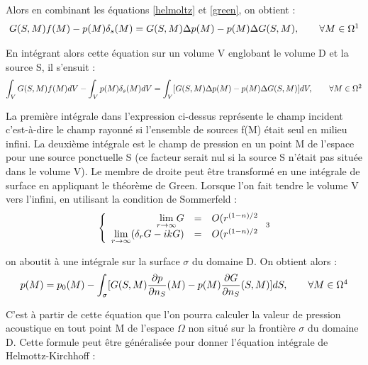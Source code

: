Alors en combinant les équations \ref{helmoltz} et \ref{green}, on obtient :
\begin{equation}
G(S,M)f(M)-p(M)\delta_s(M) = G(S,M)\Delta p(M)-p(M)\Delta G(S,M),	 	\qquad  \forall M  \in \Omega
\footnotemark
\end{equation}

En intégrant alors cette équation sur un volume V englobant le volume D et la source S, il s'ensuit :
\begin{equation}
\int_V G(S,M) f(M) dV - \int_Vp(M)\delta_s(M) dV = \int_V [G(S,M)\Delta p(M) - p(M)\Delta G(S,M)] dV,	 	\qquad  \forall M  \in \Omega
 \footnotemark
\end{equation}

La  première  intégrale  dans  l'expression  ci-dessus  représente  le  champ  incident  c'est-à-dire  le  champ  rayonné  si  l'ensemble  de  sources  f(M)  était  seul  en  milieu  infini.  La deuxième  intégrale  est  le  champ  de  pression  en  un  point  M  de  l'espace  pour  une  source ponctuelle  S  (ce  facteur  serait  nul  si  la  source  S  n'était  pas  située  dans  le  volume  V).  Le membre  de  droite  peut  être  transformé  en  une  intégrale  de  surface  en  appliquant  le théorème  de  Green. Lorsque  l'on  fait  tendre  le  volume  V  vers  l'infini,  en  utilisant  la condition de Sommerfeld :
\begin{equation}
   \left \{
	\begin{array}{r c l}
		\underset{r \to \infty}{\lim} G &=& O(r^{(1-n)/2} \\
		\underset{r \to \infty}{\lim} (\delta_r G - ikG) &=& O(r^{(1-n)/2} 
	\end{array}
   \right .
   \footnotemark
\end{equation}   

on aboutit à une intégrale sur la surface $\sigma$ du domaine D. On obtient alors :
\begin{equation}
p(M) = p_0(M) - \int_\sigma [G(S,M) \frac{\partial p}{\partial n_S}(M) - p(M) \frac{\partial G}{\partial n_S}(S,M)] dS,	 	\qquad  \forall M  \in \Omega
\footnotemark
\end{equation}


C'est à partir de cette équation que l'on pourra calculer la valeur de pression acoustique en tout point M de l'espace $\Omega$ non situé sur la frontière $\sigma$ du domaine D. Cette formule peut être généralisée pour donner l'équation intégrale de Helmottz-Kirchhoff :

